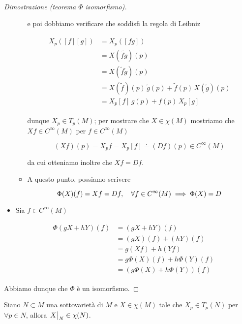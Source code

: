 \begin{proof}[Dimostrazione (teorema $ \Phi $ isomorfismo)]
\begin{itemize}
\begin{itemize}
		e poi dobbiamo verificare che soddisfi la regola di Leibniz
		
		\begin{align}
			\begin{split}
				X_{p} ([f] [g]) &= X_{p} ([f g])\\
				&= X (\tilde{f g})(p)\\
				&= X (\tilde{f} \tilde{g})(p)\\
				&= X (\tilde{f})(p) \, \tilde{g}(p) + \tilde{f}(p) \, X (\tilde{g})(p)\\
				&= X_{p} [f] \, g(p) + f(p) \, X_{p} [g]
			\end{split}
		\end{align}
	
		dunque $ X_{p} \in T_{p}(M) $; per mostrare che $ X \in \chi(M) $ mostriamo che $ X f \in C^{\infty}(M) $ per $ f \in C^{\infty}(M) $
		
		\begin{equation}
			(X f)(p) = X_{p} f %
			= X_{p} [f] %
			\doteq (D f)(p) \in C^{\infty}(M)
		\end{equation}
	
		da cui otteniamo inoltre che $ X f = D f $.
		
		\item A questo punto, possiamo scrivere
		
		\begin{equation}
			\Phi(X)(f) = X f = D f \qcomma \forall f \in C^{\infty}(M) \implies \Phi(X) = D
		\end{equation}
	\end{itemize}
	
	\item Sia $ f \in C^{\infty}(M) $
	
	\begin{align}
		\begin{split}
			\Phi(g X + h Y)(f) &= (g X + h Y)(f)\\
			&= (g X)(f) + (h Y)(f)\\
			&= g (X f) + h (Y f)\\
			&= g \Phi(X)(f) + h \Phi(Y)(f)\\
			&= (g \Phi(X) + h \Phi(Y))(f)
		\end{split}
	\end{align}
\end{itemize}

Abbiamo dunque che $ \Phi $ è un isomorfismo.
\end{proof}

\begin{lemma}
	Siano $ N \subset M $ una sottovarietà di $ M $ e $ X \in \chi(M) $ tale che $ X_{p} \in T_{p}(N) $ per $ \forall p \in N $, allora $ \eval{X}_{N} \in \chi(N) $.
\end{lemma}

